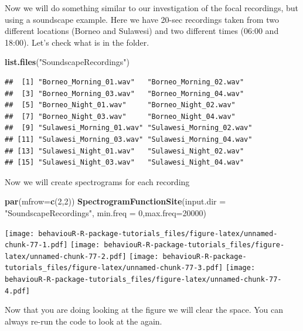 \documentclass[]{book}
\newenvironment{Shaded}{\begin{snugshade}}{\end{snugshade}}
\newcommand{\DataTypeTok}[1]{\textcolor[rgb]{0.13,0.29,0.53}{#1}}
\newcommand{\DecValTok}[1]{\textcolor[rgb]{0.00,0.00,0.81}{#1}}
\newcommand{\KeywordTok}[1]{\textcolor[rgb]{0.13,0.29,0.53}{\textbf{#1}}}
\newcommand{\NormalTok}[1]{#1}
\newcommand{\StringTok}[1]{\textcolor[rgb]{0.31,0.60,0.02}{#1}}
\begin{document}
Now we will do something similar to our investigation of the focal recordings, but using a soundscape example. Here we have 20-sec recordings taken from two different locations (Borneo and Sulawesi) and two different times (06:00 and 18:00). Let's check what is in the folder.

\begin{Shaded}
\begin{Highlighting}[]
\KeywordTok{list.files}\NormalTok{(}\StringTok{"SoundscapeRecordings"}\NormalTok{)}
\end{Highlighting}
\end{Shaded}

\begin{verbatim}
##  [1] "Borneo_Morning_01.wav"   "Borneo_Morning_02.wav"  
##  [3] "Borneo_Morning_03.wav"   "Borneo_Morning_04.wav"  
##  [5] "Borneo_Night_01.wav"     "Borneo_Night_02.wav"    
##  [7] "Borneo_Night_03.wav"     "Borneo_Night_04.wav"    
##  [9] "Sulawesi_Morning_01.wav" "Sulawesi_Morning_02.wav"
## [11] "Sulawesi_Morning_03.wav" "Sulawesi_Morning_04.wav"
## [13] "Sulawesi_Night_01.wav"   "Sulawesi_Night_02.wav"  
## [15] "Sulawesi_Night_03.wav"   "Sulawesi_Night_04.wav"
\end{verbatim}

Now we will create spectrograms for each recording

\begin{Shaded}
\begin{Highlighting}[]
\KeywordTok{par}\NormalTok{(}\DataTypeTok{mfrow=}\KeywordTok{c}\NormalTok{(}\DecValTok{2}\NormalTok{,}\DecValTok{2}\NormalTok{))}
\KeywordTok{SpectrogramFunctionSite}\NormalTok{(}\DataTypeTok{input.dir =} \StringTok{"SoundscapeRecordings"}\NormalTok{,}
                    \DataTypeTok{min.freq =} \DecValTok{0}\NormalTok{,}\DataTypeTok{max.freq=}\DecValTok{20000}\NormalTok{)}
\end{Highlighting}
\end{Shaded}

\texttt{[image: behaviouR-R-package-tutorials\_files/figure-latex/unnamed-chunk-77-1.pdf]} \texttt{[image: behaviouR-R-package-tutorials\_files/figure-latex/unnamed-chunk-77-2.pdf]} \texttt{[image: behaviouR-R-package-tutorials\_files/figure-latex/unnamed-chunk-77-3.pdf]} \texttt{[image: behaviouR-R-package-tutorials\_files/figure-latex/unnamed-chunk-77-4.pdf]}

Now that you are doing looking at the figure we will clear the space. You can always re-run the code to look at the again.
\end{document}
